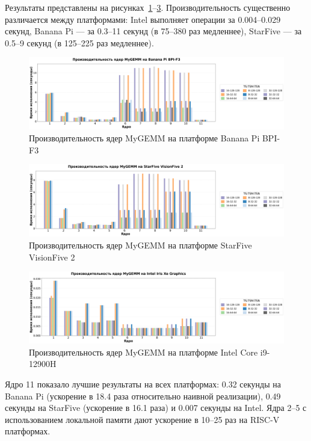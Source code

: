 Результаты представлены на рисунках~\ref{fig:perf_bananapi}--\ref{fig:perf_intelxe}. Производительность существенно различается между платформами: Intel выполняет операции за 0.004--0.029 секунд, Banana Pi --- за 0.3--11 секунд (в 75--380 раз медленнее), StarFive --- за 0.5--9 секунд (в 125--225 раз медленнее).

\begin{figure}[H]
\centering
\includegraphics[width=1\textwidth]{figures/banana_pi.png}
\caption{Производительность ядер MyGEMM на платформе Banana Pi BPI-F3}
\label{fig:perf_bananapi}
\end{figure}

\begin{figure}[H]
\centering
\includegraphics[width=1\textwidth]{figures/starfive.png}
\caption{Производительность ядер MyGEMM на платформе StarFive VisionFive 2}
\label{fig:perf_starfive}
\end{figure}

\begin{figure}[H]
\centering
\includegraphics[width=1\textwidth]{figures/intel_xe.png}
\caption{Производительность ядер MyGEMM на платформе Intel Core i9-12900H}
\label{fig:perf_intelxe}
\end{figure}

Ядро 11 показало лучшие результаты на всех платформах: 0.32 секунды на Banana Pi (ускорение в 18.4 раза относительно наивной реализации), 0.49 секунды на StarFive (ускорение в 16.1 раза) и 0.007 секунды на Intel. Ядра 2--5 с использованием локальной памяти дают ускорение в 10--25 раз на RISC-V платформах.

